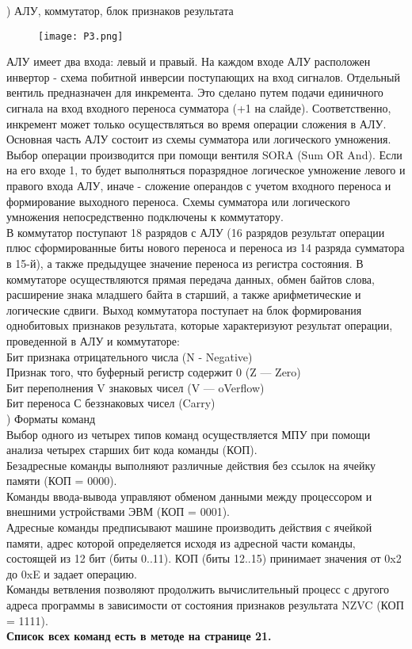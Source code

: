 ) АЛУ, коммутатор, блок признаков результата 
\begin{figure}[H]
    \centering
    \texttt{[image: P3.png]}
\end{figure}
\noindent АЛУ имеет два входа: левый и правый. На каждом входе АЛУ расположен инвертор - схема побитной инверсии поступающих на вход сигналов. Отдельный вентиль предназначен для инкремента. Это сделано путем подачи единичного сигнала на вход входного переноса сумматора (+1 на слайде). Соответственно, инкремент может только осуществляться во время операции сложения в АЛУ. \\
Основная часть АЛУ состоит из схемы сумматора или логического умножения. Выбор операции производится при помощи вентиля SORA (Sum OR And). Если на его входе 1, то будет выполняться поразрядное логическое умножение левого и правого входа АЛУ, иначе - сложение операндов с учетом входного переноса и формирование выходного переноса. Схемы сумматора или логического умножения непосредственно подключены к коммутатору. \\
В коммутатор поступают 18 разрядов с АЛУ (16 разрядов результат операции плюс сформированные биты нового переноса и переноса из 14 разряда сумматора в 15-й), а также предыдущее значение переноса из регистра состояния. В коммутаторе осуществляются прямая передача данных, обмен байтов слова, расширение знака младшего байта в старший, а также арифметические и логические сдвиги. Выход коммутатора поступает на блок формирования однобитовых признаков результата, которые характеризуют результат операции, проведенной в АЛУ и коммутаторе: \\
Бит признака отрицательного числа (N - Negative) \\
Признак того, что буферный регистр содержит 0 (Z — Zero) \\
Бит переполнения V знаковых чисел (V — oVerflow) \\
Бит переноса С беззнаковых чисел (Carry) \\

) Форматы команд \\
Выбор одного из четырех типов команд осуществляется МПУ при помощи анализа четырех старших бит кода команды (КОП). \\
Безадресные команды выполняют различные действия без ссылок на ячейку памяти (КОП = 0000). \\
Команды ввода-вывода управляют обменом данными между процессором и внешними устройствами ЭВМ (КОП = 0001). \\
Адресные команды предписывают машине производить действия с ячейкой памяти, адрес которой определяется исходя из адресной части команды, состоящей из 12 бит (биты 0..11). КОП (биты 12..15) принимает значения от 0x2 до 0xE и задает
операцию. \\
Команды ветвления позволяют продолжить вычислительный процесс с другого адреса программы в зависимости от состояния признаков результата NZVC (КОП = 1111). \\
\textbf{Список всех команд есть в методе на странице 21.} \\

